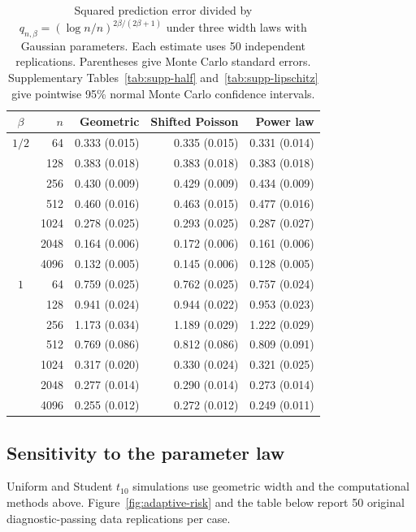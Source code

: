 \documentclass[11pt,a4paper]{article}
\theoremstyle{remark}
\begin{document}
\begin{table}[htbp]
\caption{Squared prediction error divided by $q_{n,\beta}=(\log n/n)^{2\beta/(2\beta+1)}$ under three width laws with Gaussian parameters. Each estimate uses 50 independent replications. Parentheses give Monte Carlo standard errors. Supplementary Tables~\ref{tab:supp-half} and~\ref{tab:supp-lipschitz} give pointwise 95\% normal Monte Carlo confidence intervals.}
\label{tab:width-robustness}
\centering\small
\begin{tabular}{@{}crrrr@{}}
\toprule
$\beta$ & $n$ & Geometric & Shifted Poisson & Power law\\
\midrule
$1/2$ & 64 & 0.333 (0.015) & 0.335 (0.015) & 0.331 (0.014)\\
 & 128 & 0.383 (0.018) & 0.383 (0.018) & 0.383 (0.018)\\
 & 256 & 0.430 (0.009) & 0.429 (0.009) & 0.434 (0.009)\\
 & 512 & 0.460 (0.016) & 0.463 (0.015) & 0.477 (0.016)\\
 & 1024 & 0.278 (0.025) & 0.293 (0.025) & 0.287 (0.027)\\
 & 2048 & 0.164 (0.006) & 0.172 (0.006) & 0.161 (0.006)\\
 & 4096 & 0.132 (0.005) & 0.145 (0.006) & 0.128 (0.005)\\
\midrule
$1$ & 64 & 0.759 (0.025) & 0.762 (0.025) & 0.757 (0.024)\\
 & 128 & 0.941 (0.024) & 0.944 (0.022) & 0.953 (0.023)\\
 & 256 & 1.173 (0.034) & 1.189 (0.029) & 1.222 (0.029)\\
 & 512 & 0.769 (0.086) & 0.812 (0.086) & 0.809 (0.091)\\
 & 1024 & 0.317 (0.020) & 0.330 (0.024) & 0.321 (0.025)\\
 & 2048 & 0.277 (0.014) & 0.290 (0.014) & 0.273 (0.014)\\
 & 4096 & 0.255 (0.012) & 0.272 (0.012) & 0.249 (0.011)\\
\bottomrule
\end{tabular}
\end{table}

\subsection{Sensitivity to the parameter law}
\label{app:simulation-weights}
Uniform and Student $t_{10}$ simulations use geometric width and the computational methods above. Figure~\ref{fig:adaptive-risk} and the table below report 50 original diagnostic-passing data replications per case.
\end{document}
